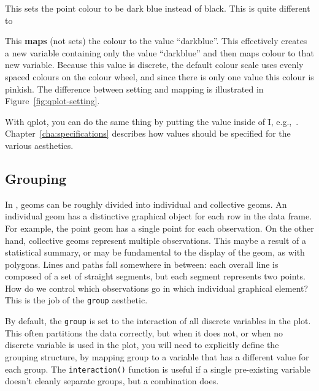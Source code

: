 \noindent This sets the point colour to be dark blue instead of black.  This is quite different to

% 


\noindent This {\bf maps} (not sets) the colour to the value ``darkblue''.  This effectively creates a new variable containing only the value  ``darkblue'' and then maps colour to that new variable.  Because this value is discrete, the default colour scale uses evenly spaced colours on the colour wheel, and since there is only one value this colour is pinkish.  The difference between setting and mapping is illustrated in Figure~\ref{fig:qplot-setting}.  

With qplot, you can do the same thing by putting the value inside of \f{I}, e.g.,\ .  Chapter~\ref{cha:specifications} describes how values should be specified for the various aesthetics.

% 


\subsection{Grouping}
\label{sub:grouping}

In \ggplot, geoms can be roughly divided into individual and collective geoms.  An individual geom has a distinctive graphical object for each row in the data frame.  For example, the point geom has a single point for each observation.  On the other hand, collective geoms represent multiple observations.  This maybe a result of a statistical summary, or may be fundamental to the display of the geom, as with polygons.  Lines and paths fall somewhere in between:  each overall line is composed of a set of straight segments, but each segment represents two points.  How do we control which observations go in which individual graphical element?  This is the job of the {\tt group} aesthetic. 

By default, the {\tt group} is set to the interaction of all discrete variables in the plot.  This often partitions the data correctly, but when it does not, or when no discrete variable is used in the plot, you will need to explicitly define the grouping structure, by mapping group to a variable that has a different value for each group.  The {\tt interaction()} function is useful if a single pre-existing variable doesn't cleanly separate groups, but a combination does.  

